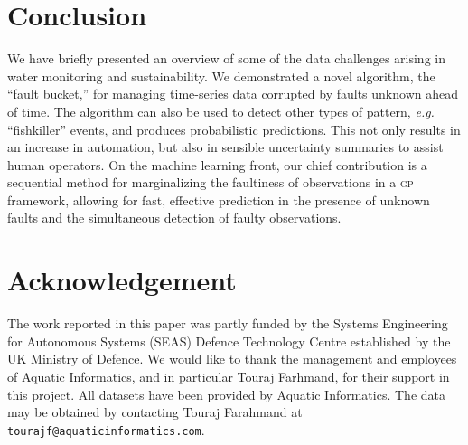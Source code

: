 \documentclass{article}
\newcommand{\acro}[1]{\textsc{#1}}
\begin{document}
\section{Conclusion}
We have briefly presented an overview of some of the data challenges arising in water monitoring and sustainability. We demonstrated a novel algorithm, the ``fault bucket,'' for managing
time-series data corrupted by faults unknown ahead of time. The algorithm can also be used to detect other types of pattern, \emph{e.g.} ``fishkiller'' events, and produces probabilistic predictions. This not only results in an increase in automation, but also in sensible uncertainty summaries to assist human operators. On the machine learning front, our chief
contribution is a sequential method for marginalizing the
faultiness of observations in a \acro{gp} framework, allowing for
fast, effective prediction in the presence of unknown faults and the
simultaneous detection of faulty observations.

\section*{Acknowledgement}
The work reported in this paper was partly funded by the Systems
Engineering for Autonomous Systems (SEAS) Defence Technology Centre
established by the UK Ministry of Defence. We would like to thank the management and employees of Aquatic Informatics, and in particular Touraj Farhmand, for their support in this project.
All datasets have been provided by Aquatic Informatics. The data may
be obtained by contacting Touraj Farahmand at
\texttt{tourajf@aquaticinformatics.com}. 




\end{document}
